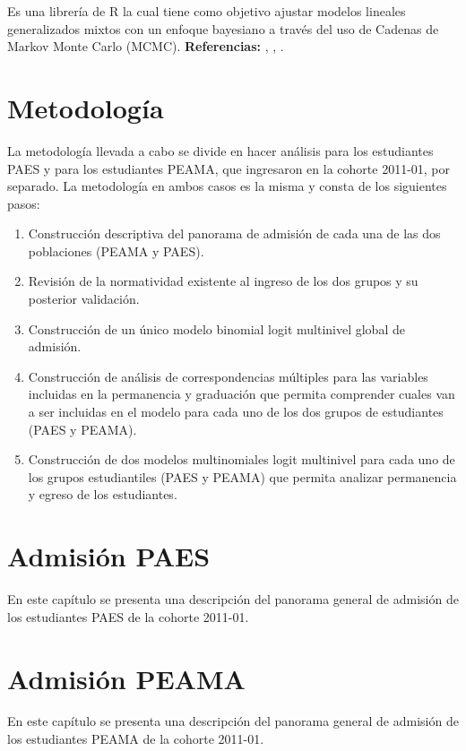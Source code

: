 \documentclass[]{book}
\providecommand{\tightlist}{%
  \setlength{\itemsep}{0pt}\setlength{\parskip}{0pt}}
\theoremstyle{definition}
\theoremstyle{definition}
\theoremstyle{definition}
\theoremstyle{remark}
\begin{document}
Es una librería de R la cual tiene como objetivo ajustar modelos
lineales generalizados mixtos con un enfoque bayesiano a través del uso
de Cadenas de Markov Monte Carlo (MCMC). \textbf{Referencias:}
\citep{MCMCglmm}, \citep{HadfieldBook}, \citep{HadfieldCourseNotes}.

\chapter{Metodología}\label{metodologuxeda}

La metodología llevada a cabo se divide en hacer análisis para los
estudiantes PAES y para los estudiantes PEAMA, que ingresaron en la
cohorte 2011-01, por separado. La metodología en ambos casos es la misma
y consta de los siguientes pasos:

\begin{enumerate}
\def\labelenumi{\arabic{enumi}.}
\tightlist
\item
  Construcción descriptiva del panorama de admisión de cada una de las
  dos poblaciones (PEAMA y PAES).
\item
  Revisión de la normatividad existente al ingreso de los dos grupos y
  su posterior validación.
\item
  Construcción de un único modelo binomial logit multinivel global de
  admisión.
\item
  Construcción de análisis de correspondencias múltiples para las
  variables incluidas en la permanencia y graduación que permita
  comprender cuales van a ser incluidas en el modelo para cada uno de
  los dos grupos de estudiantes (PAES y PEAMA).
\item
  Construcción de dos modelos multinomiales logit multinivel para cada
  uno de los grupos estudiantiles (PAES y PEAMA) que permita analizar
  permanencia y egreso de los estudiantes.
\end{enumerate}

\chapter{Admisión PAES}\label{admision-paes}

En este capítulo se presenta una descripción del panorama general de
admisión de los estudiantes PAES de la cohorte 2011-01.

\chapter{Admisión PEAMA}\label{admision-peama}

En este capítulo se presenta una descripción del panorama general de
admisión de los estudiantes PEAMA de la cohorte 2011-01.


\end{document}
